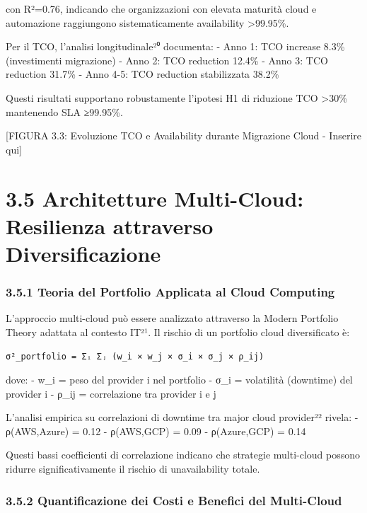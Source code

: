 \documentclass[12pt,a4paper,oneside]{book}
\begin{document}
con R²=0.76, indicando che organizzazioni con elevata maturità cloud e
automazione raggiungono sistematicamente availability
\textgreater99.95\%.

Per il TCO, l'analisi longitudinale²⁰ documenta: - Anno 1: TCO increase
8.3\% (investimenti migrazione) - Anno 2: TCO reduction 12.4\% - Anno 3:
TCO reduction 31.7\% - Anno 4-5: TCO reduction stabilizzata 38.2\%

Questi risultati supportano robustamente l'ipotesi H1 di riduzione TCO
\textgreater30\% mantenendo SLA ≥99.95\%.

{[}FIGURA 3.3: Evoluzione TCO e Availability durante Migrazione Cloud -
Inserire qui{]}

\section{3.5 Architetture Multi-Cloud: Resilienza attraverso
Diversificazione}\label{architetture-multi-cloud-resilienza-attraverso-diversificazione}

\subsubsection{3.5.1 Teoria del Portfolio Applicata al Cloud
Computing}\label{teoria-del-portfolio-applicata-al-cloud-computing}

L'approccio multi-cloud può essere analizzato attraverso la Modern
Portfolio Theory adattata al contesto IT²¹. Il rischio di un portfolio
cloud diversificato è:

\begin{verbatim}
σ²_portfolio = Σᵢ Σⱼ (w_i × w_j × σ_i × σ_j × ρ_ij)
\end{verbatim}

dove: - w\_i = peso del provider i nel portfolio - σ\_i = volatilità
(downtime) del provider i - ρ\_ij = correlazione tra provider i e j

L'analisi empirica su correlazioni di downtime tra major cloud
provider²² rivela: - ρ(AWS,Azure) = 0.12 - ρ(AWS,GCP) = 0.09 -
ρ(Azure,GCP) = 0.14

Questi bassi coefficienti di correlazione indicano che strategie
multi-cloud possono ridurre significativamente il rischio di
unavailability totale.

\subsubsection{3.5.2 Quantificazione dei Costi e Benefici del
Multi-Cloud}\label{quantificazione-dei-costi-e-benefici-del-multi-cloud}
\end{document}
